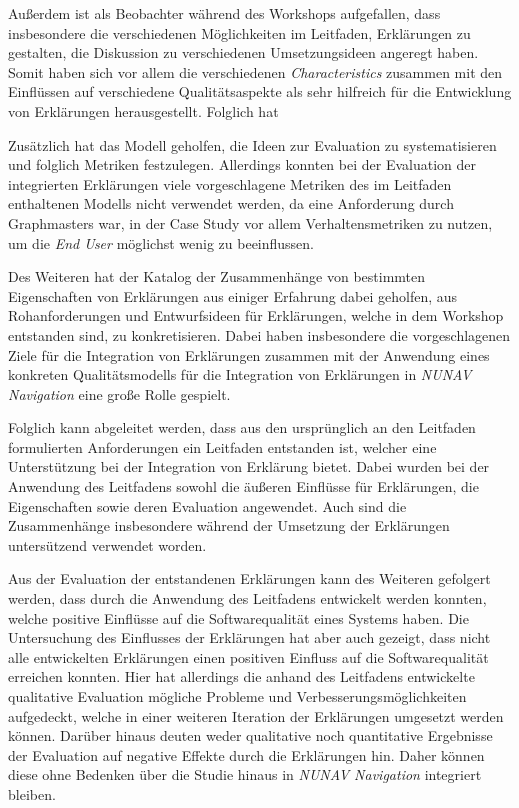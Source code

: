 Außerdem ist als Beobachter während des Workshops aufgefallen, dass insbesondere die verschiedenen Möglichkeiten im Leitfaden, Erklärungen zu gestalten, die Diskussion zu verschiedenen Umsetzungsideen angeregt haben. Somit haben sich vor allem die verschiedenen \textit{Characteristics} zusammen mit den Einflüssen auf verschiedene Qualitätsaspekte als sehr hilfreich für die Entwicklung von Erklärungen herausgestellt. Folglich hat 

Zusätzlich hat das Modell geholfen, die Ideen zur Evaluation zu systematisieren und folglich Metriken festzulegen. Allerdings konnten bei der Evaluation der integrierten Erklärungen viele vorgeschlagene Metriken des im Leitfaden enthaltenen Modells nicht verwendet werden, da eine Anforderung durch Graphmasters war, in der Case Study vor allem Verhaltensmetriken zu nutzen, um die \textit{End User} möglichst wenig zu beeinflussen.

Des Weiteren hat der Katalog der Zusammenhänge von bestimmten Eigenschaften von Erklärungen aus einiger Erfahrung dabei geholfen, aus Rohanforderungen und Entwurfsideen für Erklärungen, welche in dem Workshop entstanden sind, zu konkretisieren. Dabei haben insbesondere die vorgeschlagenen Ziele für die Integration von Erklärungen zusammen mit der Anwendung eines konkreten Qualitätsmodells für die Integration von Erklärungen in \textit{NUNAV Navigation} eine große Rolle gespielt.

Folglich kann abgeleitet werden, dass aus den ursprünglich an den Leitfaden formulierten Anforderungen ein Leitfaden entstanden ist, welcher eine Unterstützung bei der Integration von Erklärung bietet. Dabei wurden bei der Anwendung des Leitfadens sowohl die äußeren Einflüsse für Erklärungen, die Eigenschaften sowie deren Evaluation angewendet. Auch sind die Zusammenhänge insbesondere während der Umsetzung der Erklärungen untersützend verwendet worden.

Aus der Evaluation der entstandenen Erklärungen kann des Weiteren gefolgert werden, dass durch die Anwendung des Leitfadens entwickelt werden konnten, welche positive Einflüsse auf die Softwarequalität eines Systems haben. Die Untersuchung des Einflusses der Erklärungen hat aber auch gezeigt, dass nicht alle entwickelten Erklärungen einen positiven Einfluss auf die Softwarequalität erreichen konnten. Hier hat allerdings die anhand des Leitfadens entwickelte qualitative Evaluation mögliche Probleme und Verbesserungsmöglichkeiten aufgedeckt, welche in einer weiteren Iteration der Erklärungen umgesetzt werden können. Darüber hinaus deuten weder qualitative noch quantitative Ergebnisse der Evaluation auf negative Effekte durch die Erklärungen hin. Daher können diese ohne Bedenken über die Studie hinaus in \textit{NUNAV Navigation} integriert bleiben.

